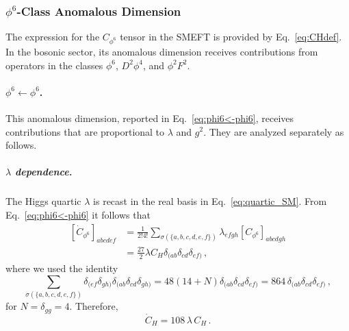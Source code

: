 \subsubsection{\texorpdfstring{$\phi^6$}{phi6}-Class Anomalous Dimension}

The expression for the $C_{\phi^6}$ tensor in the SMEFT is provided by Eq.~\eqref{eq:CHdef}.
In the bosonic sector, its anomalous dimension receives contributions from operators in the classes $\phi^6$, $D^2\phi^4$, and $\phi^2 F^2$.

\paragraph{\texorpdfstring{$\phi^6\leftarrow \phi^6$}{phi6tophi6}.}
This anomalous dimension, reported in Eq.~\eqref{eq:phi6<-phi6}, receives contributions that are proportional to $\lambda$ and $g^2$.
They are analyzed separately as follows.

\subparagraph{$\lambda$ dependence.}
The Higgs quartic $\lambda$ is recast in the real basis in Eq.~\eqref{eq:quartic_SM}. From Eq.~\eqref{eq:phi6<-phi6} it follows that
\begin{align}
    \left[\dot C_{\phi^6}\right]_{abcdef} &= 
    \frac{1}{2!4!}\sum_{\sigma(\{a,b,c,d,e,f\})}\lambda_{efgh} \left[C_{\phi^6}\right]_{abcdgh}\nonumber \\
    &= \frac{27}{2} \lambda  C_H \delta_{(ab}\delta_{cd}\delta_{ef)}\,,
\end{align}
where we used the identity
\begin{equation}
    \sum_{\sigma(\{a,b,c,d,e,f\})}\delta_{(ef}\delta_{gh)}\delta_{(ab}\delta_{cd}\delta_{gh)} = 48(14+N)\delta_{(ab}\delta_{cd}\delta_{ef)} = 864 \,\delta_{(ab}\delta_{cd}\delta_{ef)}\,,
    \label{eq:identity_permutations}
\end{equation}
for $N=\delta_{gg}=4$.
Therefore,
\begin{equation}
    \dot C_H = 108\, \lambda\, C_H\,.
\end{equation}


